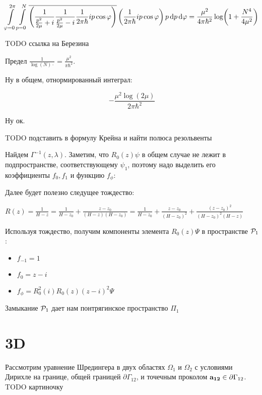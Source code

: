 \[
\int\limits_{\varphi = 0}^{2 \pi} \int\limits_{p = 0}^N
\overline{\left(
\frac{1}{\frac{p^2}{2 \mu} + i} \frac{1}{\frac{p^2}{2 \mu} - i} \frac{1}{2 \pi \hbar} i p \cos \varphi
\right)}
\left(
\frac{1}{2 \pi \hbar} i p \cos \varphi
\right)
p \dd{p} \dd{\varphi}
=
\frac{\mu^2}{4 \pi \hbar^2} \log(1 + \frac{N^4}{4 \mu^2})
\]

TODO ссылка на Березина

Предел $\frac{1}{\log(N) \cdot} = \frac{\mu^2}{\pi \hbar^2}$.

Ну в общем, отнормированный интеграл:

\[
-\frac{\mu^2 \log (2 \mu)}{2 \pi  \hbar ^2}
\]

Ну ок.

TODO подставить в формулу Крейна и найти полюса резольвенты

Найдем $\Gamma^{-1}(z, \lambda)$. Заметим, что $R_0(z) \psi$ в общем случае не лежит в подпространстве, соответствующему $\psi_1$, поэтому надо выделить его коэффициенты $f_0, f_1$ и функцию $f_\phi$:


Далее будет полезно следущее тождество:

$R(z) = \frac{1}{H - z} = \frac{1}{H - z_0} + \frac{z - z_0}{(H - z)(H - z_0)} = \frac{1}{H - z_0} + \frac{z - z_0}{(H - z_0)^2} + \frac{(z - z_0)^2}{(H - z_0)^2 (H - z)}$

Используя тождество, получим компоненты элемента $R_0(z) \Psi$ в пространстве $\mathcal{P}_1$:

\begin{itemize}
\item $f_{-1} = 1$
\item $f_0 = z - i$
\item $f_\phi = R_0^2(i) R_0(z) (z - i)^2 \Psi$
\end{itemize}



Замыкание $\mathcal{P}_1$ дает нам понтрягинское пространство $\Pi_1$


\section{3D}
Рассмотрим уравнение Шредингера в двух областях $\Omega_1$ и $\Omega_2$ с условиями Дирихле на границе, общей границей $\partial \Gamma_{12}$, и точечным проколом $\vb{a_{12}} \in \partial \Gamma_{12}$. TODO картиночку

